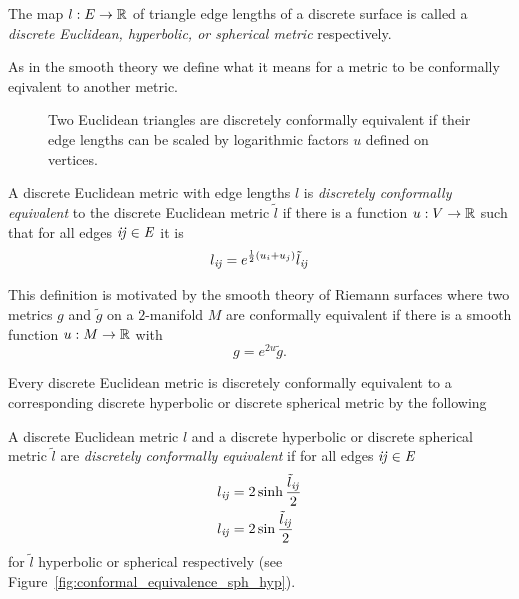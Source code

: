\begin{definition}
The map $l:E\to \mathbb R$ of triangle edge lengths of a discrete surface is called a \emph{discrete Euclidean, hyperbolic, or spherical metric} respectively.
\end{definition}

As in the smooth theory we define what it means for a metric to be conformally eqivalent to another metric. 

\begin{figure}
\centering
\scalebox{0.5}{}
\caption[Euclidean conformal equivalence]{Two Euclidean triangles are discretely conformally equivalent if their edge lengths can be scaled by logarithmic factors $u$ defined on vertices.}
\label{fig:conformal_equivalence}
\end{figure}

\begin{definition}
\label{def:conformal_equivalence_euclidean}
A discrete Euclidean metric with edge lengths $l$ is \emph{discretely conformally equivalent} to the discrete Euclidean metric $\tilde l$ if there is a function $u:V\to \mathbb R$ such that for all edges $\it{ij}\in E$ it is
\begin{equation}
l_{\it{ij}} = e^{\frac{1}{2}(u_i + u_j)}\tilde l_{\it{ij}} \label{eq:euclidean_equivalence}
\end{equation}
\end{definition}

This definition is motivated by the smooth theory of Riemann surfaces where two metrics $g$ and $\tilde g$ on a $2$-manifold $M$ are conformally equivalent if there is a smooth function $u:M\to \mathbb R$ with \[g=e^{2u}\tilde g.\]

Every discrete Euclidean metric is discretely conformally equivalent to a corresponding discrete hyperbolic or discrete spherical metric by the following

\begin{definition}
\label{def:conformal_equivalence_general}
A discrete Euclidean metric $l$ and a discrete hyperbolic or discrete spherical metric $\tilde l$ are \emph{discretely conformally equivalent} if for all edges $\it{ij}\in E$
\begin{align}
l_{\it{ij}} &= 2\sinh \frac{\tilde l_{\it{ij}}}{2} \label{eq:hyperbolic_equivalence}\\
l_{\it{ij}} &= 2\sin \frac{\tilde l_{\it{ij}}}{2} \label{eq:spherical_equivalence}
\end{align}
for $\tilde l$ hyperbolic or spherical respectively (see Figure~\ref{fig:conformal_equivalence_sph_hyp}).
\end{definition}


